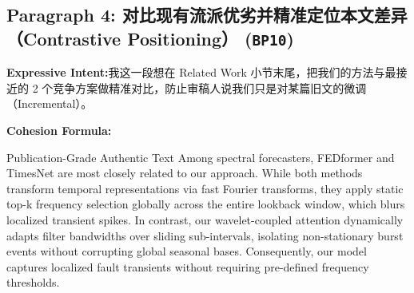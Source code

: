 \subsection*{Paragraph 4: 对比现有流派优劣并精准定位本文差异（Contrastive Positioning） (\texttt{BP10})}
\noindent\textbf{Expressive Intent:}\enspace 我这一段想在 Related Work 小节末尾，把我们的方法与最接近的 2 个竞争方案做精准对比，防止审稿人说我们只是对某篇旧文的微调（Incremental）。\par
\noindent\textbf{Cohesion Formula:}\par\vspace{4pt}
\begin{ExampleBox}{Publication-Grade Authentic Text}
Among spectral forecasters, FEDformer and TimesNet are most closely related to our approach. While both methods transform temporal representations via fast Fourier transforms, they apply static top-k frequency selection globally across the entire lookback window, which blurs localized transient spikes. In contrast, our wavelet-coupled attention dynamically adapts filter bandwidths over sliding sub-intervals, isolating non-stationary burst events without corrupting global seasonal bases. Consequently, our model captures localized fault transients without requiring pre-defined frequency thresholds.
\end{ExampleBox}
